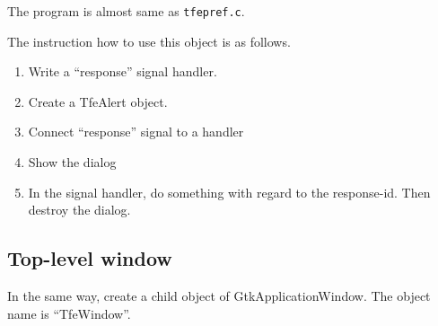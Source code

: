 The program is almost same as \passthrough{\lstinline!tfepref.c!}.

The instruction how to use this object is as follows.

\begin{enumerate}
\def\labelenumi{\arabic{enumi}.}
\tightlist
\item
  Write a ``response'' signal handler.
\item
  Create a TfeAlert object.
\item
  Connect ``response'' signal to a handler
\item
  Show the dialog
\item
  In the signal handler, do something with regard to the response-id.
  Then destroy the dialog.
\end{enumerate}

\hypertarget{top-level-window}{%
\subsection{Top-level window}\label{top-level-window}}

In the same way, create a child object of GtkApplicationWindow. The
object name is ``TfeWindow''.

